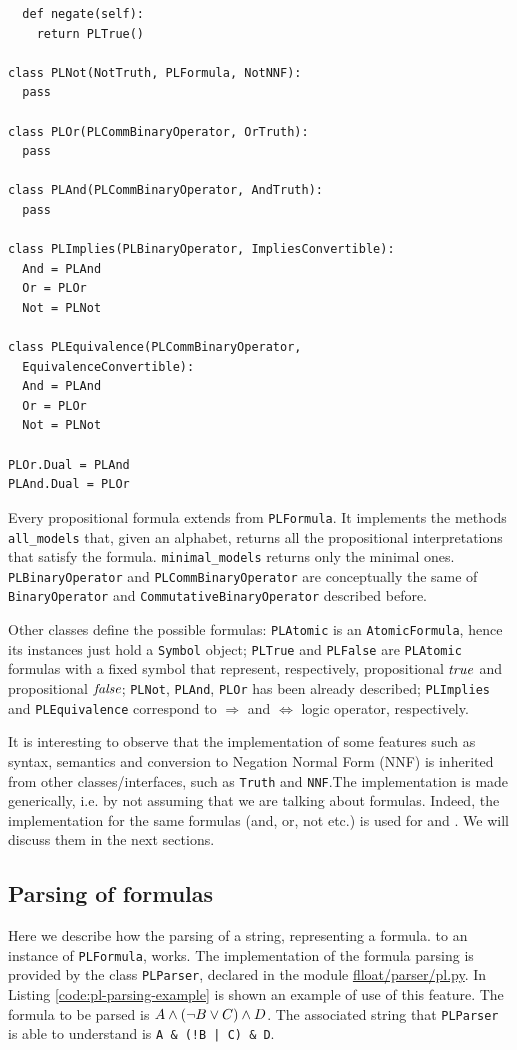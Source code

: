 \begin{lstlisting}
  def negate(self):
    return PLTrue()

class PLNot(NotTruth, PLFormula, NotNNF):
  pass

class PLOr(PLCommBinaryOperator, OrTruth):
  pass

class PLAnd(PLCommBinaryOperator, AndTruth):
  pass

class PLImplies(PLBinaryOperator, ImpliesConvertible):
  And = PLAnd
  Or = PLOr
  Not = PLNot

class PLEquivalence(PLCommBinaryOperator, 
  EquivalenceConvertible):
  And = PLAnd
  Or = PLOr
  Not = PLNot

PLOr.Dual = PLAnd
PLAnd.Dual = PLOr

\end{lstlisting}
Every propositional formula extends from \texttt{PLFormula}. It implements the methods \texttt{all\_models} that, given an alphabet, returns all the propositional interpretations that satisfy the formula. \texttt{minimal\_models} returns only the minimal ones. \texttt{PLBinaryOperator} and \texttt{PLCommBinaryOperator} are conceptually the same of \texttt{BinaryOperator} and \texttt{CommutativeBinaryOperator} described before. 

Other classes define the possible \PL formulas: \texttt{PLAtomic} is an \texttt{AtomicFormula}, hence its instances just hold a \texttt{Symbol} object; \texttt{PLTrue} and \texttt{PLFalse} are \texttt{PLAtomic} formulas with a fixed symbol that represent, respectively, propositional $\mathit{true}$ and propositional $\mathit{false}$; \texttt{PLNot}, \texttt{PLAnd}, \texttt{PLOr} has been already described; \texttt{PLImplies} and \texttt{PLEquivalence} correspond to $\Rightarrow$ and $\Leftrightarrow$ logic operator, respectively.

It is interesting to observe that the implementation of some features such as syntax, semantics and conversion to Negation Normal Form (NNF) is inherited from other classes/interfaces, such as \texttt{Truth} and \texttt{NNF}.The implementation is made generically, i.e. by not assuming that we are talking about \PL formulas. Indeed, the implementation for the same formulas (and, or, not etc.) is used for \PL and \LLf. We will discuss them in the next sections.

\subsection{Parsing of \PL formulas}\label{sect:flloat-pl-parsing}
Here we describe how the parsing of a string, representing a \PL formula. to an instance of \texttt{PLFormula}, works. The implementation of the \PL formula parsing is provided by the class \texttt{PLParser}, declared in the module \href{https://github.com/MarcoFavorito/flloat/blob/0.1.4/flloat/parser/pl.py}{flloat/parser/pl.py}.
In Listing \ref{code:pl-parsing-example} is shown an example of use of this feature. The formula to be parsed is $A \wedge (\lnot B \vee C) \wedge D$. The associated string that \texttt{PLParser} is able to understand is \texttt{A \& (!B | C) \& D}.


